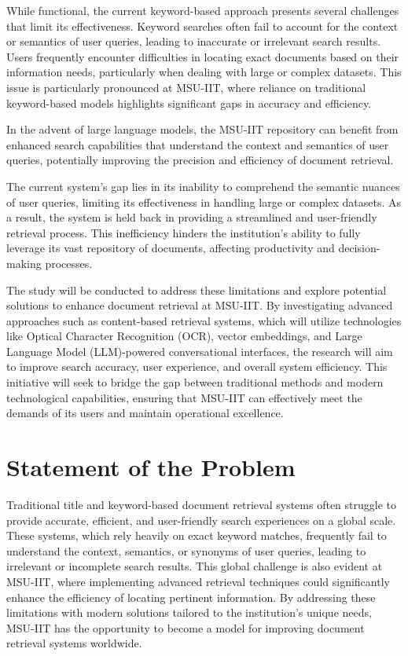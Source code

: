 \noindent While functional, the current keyword-based approach presents several challenges that limit its effectiveness. Keyword searches often fail to account for the context or semantics of user queries, leading to inaccurate or irrelevant search results. Users frequently encounter difficulties in locating exact documents based on their information needs, particularly when dealing with large or complex datasets. This issue is particularly pronounced at MSU-IIT, where reliance on traditional keyword-based models highlights significant gaps in accuracy and efficiency.

\noindent In the advent of large language models, the MSU-IIT repository can benefit from enhanced search capabilities that understand the context and semantics of user queries, potentially improving the precision and efficiency of document retrieval.

\noindent The current system's gap lies in its inability to comprehend the semantic nuances of user queries, limiting its effectiveness in handling large or complex datasets. As a result, the system is held back in providing a streamlined and user-friendly retrieval process. This inefficiency hinders the institution's ability to fully leverage its vast repository of documents, affecting productivity and decision-making processes.

\noindent The study will be conducted to address these limitations and explore potential solutions to enhance document retrieval at MSU-IIT. By investigating advanced approaches such as content-based retrieval systems, which will utilize technologies like Optical Character Recognition (OCR), vector embeddings, and Large Language Model (LLM)-powered conversational interfaces, the research will aim to improve search accuracy, user experience, and overall system efficiency. This initiative will seek to bridge the gap between traditional methods and modern technological capabilities, ensuring that MSU-IIT can effectively meet the demands of its users and maintain operational excellence.

\section{Statement of the Problem}

\noindent Traditional title and keyword-based document retrieval systems often struggle to provide accurate, efficient, and user-friendly search experiences on a global scale. These systems, which rely heavily on exact keyword matches, frequently fail to understand the context, semantics, or synonyms of user queries, leading to irrelevant or incomplete search results. This global challenge is also evident at MSU-IIT, where implementing advanced retrieval techniques could significantly enhance the efficiency of locating pertinent information. By addressing these limitations with modern solutions tailored to the institution's unique needs, MSU-IIT has the opportunity to become a model for improving document retrieval systems worldwide.


